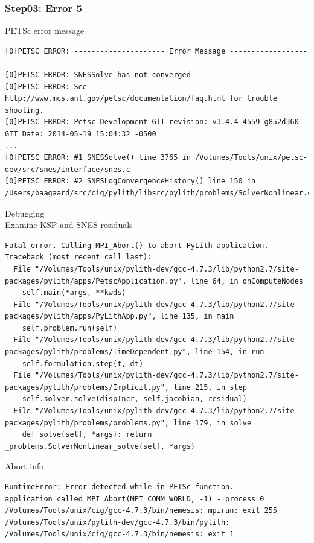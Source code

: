 \documentclass[aspectration=169]{beamer}
\newcommand{\errlabel}[1]{{\small \color{blue}#1}}
\newcommand{\debuginfo}[1]{{\small \color{green}#1}}
\begin{document}
\begin{frame}[fragile]
  \frametitle{Step03: Error 5}

\errlabel{PETSc error message}
\begin{lstlisting}
[0]PETSC ERROR: --------------------- Error Message --------------------------------------------------------------
[0]PETSC ERROR: SNESSolve has not converged
[0]PETSC ERROR: See http://www.mcs.anl.gov/petsc/documentation/faq.html for trouble shooting.
[0]PETSC ERROR: Petsc Development GIT revision: v3.4.4-4559-g852d360  GIT Date: 2014-05-19 15:04:32 -0500
...
[0]PETSC ERROR: #1 SNESSolve() line 3765 in /Volumes/Tools/unix/petsc-dev/src/snes/interface/snes.c
[0]PETSC ERROR: #2 SNESLogConvergenceHistory() line 150 in /Users/baagaard/src/cig/pylith/libsrc/pylith/problems/SolverNonlinear.cc
\end{lstlisting}
\errlabel{Debugging}\\
\debuginfo{Examine KSP and SNES residuals}

\begin{lstlisting}
Fatal error. Calling MPI_Abort() to abort PyLith application.
Traceback (most recent call last):
  File "/Volumes/Tools/unix/pylith-dev/gcc-4.7.3/lib/python2.7/site-packages/pylith/apps/PetscApplication.py", line 64, in onComputeNodes
    self.main(*args, **kwds)
  File "/Volumes/Tools/unix/pylith-dev/gcc-4.7.3/lib/python2.7/site-packages/pylith/apps/PyLithApp.py", line 135, in main
    self.problem.run(self)
  File "/Volumes/Tools/unix/pylith-dev/gcc-4.7.3/lib/python2.7/site-packages/pylith/problems/TimeDependent.py", line 154, in run
    self.formulation.step(t, dt)
  File "/Volumes/Tools/unix/pylith-dev/gcc-4.7.3/lib/python2.7/site-packages/pylith/problems/Implicit.py", line 215, in step
    self.solver.solve(dispIncr, self.jacobian, residual)
  File "/Volumes/Tools/unix/pylith-dev/gcc-4.7.3/lib/python2.7/site-packages/pylith/problems/problems.py", line 179, in solve
    def solve(self, *args): return _problems.SolverNonlinear_solve(self, *args)
\end{lstlisting}
\errlabel{Abort info}
\begin{lstlisting}
RuntimeError: Error detected while in PETSc function.
application called MPI_Abort(MPI_COMM_WORLD, -1) - process 0
/Volumes/Tools/unix/cig/gcc-4.7.3/bin/nemesis: mpirun: exit 255
/Volumes/Tools/unix/pylith-dev/gcc-4.7.3/bin/pylith: /Volumes/Tools/unix/cig/gcc-4.7.3/bin/nemesis: exit 1
\end{lstlisting}

\end{frame}
\end{document}
